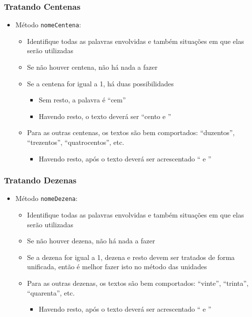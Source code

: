 \documentclass[xcolor={dvipsnames,table},aspectratio=169]{beamer}
\begin{document}
\begin{frame}\frametitle{Tratando Centenas}
\begin{itemize}
	\item Método \texttt{nomeCentena}:
	\begin{itemize}
		\item Identifique todas as palavras envolvidas e também situações em que elas serão utilizadas
		\item Se não houver centena, não há nada a fazer
		\item Se a centena for igual a 1, há duas possibilidades
		\begin{itemize}
			\item Sem resto, a palavra é ``cem''
			\item Havendo resto, o texto deverá ser ``cento e ''
		\end{itemize}
		\item Para as outras centenas, os textos são bem comportados: ``duzentos'', ``trezentos'', ``quatrocentos'', etc.
		\begin{itemize}
			\item Havendo resto, após o texto deverá ser acrescentado `` e ''
		\end{itemize}
	\end{itemize}
\end{itemize}
\end{frame}

\begin{frame}\frametitle{Tratando Dezenas}
\begin{itemize}
	\item Método \texttt{nomeDezena}:
	\begin{itemize}
		\item Identifique todas as palavras envolvidas e também situações em que elas serão utilizadas
		\item Se não houver dezena, não há nada a fazer
		\item Se a dezena for igual a 1, dezena e resto devem ser tratados de forma unificada, então é melhor fazer isto no método das unidades
		\item Para as outras dezenas, os textos são bem comportados: ``vinte'', ``trinta'', ``quarenta'', etc.
		\begin{itemize}
			\item Havendo resto, após o texto deverá ser acrescentado `` e ''
		\end{itemize}
	\end{itemize}
\end{itemize}
\end{frame}
\end{document}
